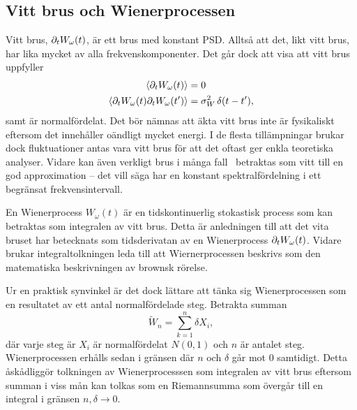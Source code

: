 \subsection{Vitt brus och Wienerprocessen}\label{sec:white_noise}
Vitt brus, $\partial_tW_\omega(t)$,\footnotemark{} är ett brus med konstant PSD. Alltså att det, likt vitt brus, har lika mycket av alla frekvenskomponenter. Det går dock att visa att vitt brus uppfyller \cite{Miller_probability2012}
\begin{equation}\label{eq:white_noise}
\begin{aligned}
\ev{\pd_tW_\omega(t)}&=0 \\
\ev{\pd_tW_\omega(t)\pd_tW_\omega(t')}&= \sigma_W^2 \, \delta(t-t'),
\end{aligned}
\end{equation}
samt är normalfördelat. 
Det bör nämnas att äkta vitt brus inte är fysikaliskt eftersom det innehåller oändligt mycket energi. I de flesta tillämpningar brukar dock fluktuationer antas vara vitt brus för att det oftast ger enkla teoretiska analyser. Vidare kan även verkligt brus i många fall~\cite{Engelberg_noise2007} betraktas som vitt till en god approximation -- det vill säga har en konstant spektralfördelning i ett begränsat frekvensintervall.


En Wienerprocess $W_\omega(t)$ är en tidskontinuerlig stokastisk process som kan betraktas som integralen av vitt brus\cite{Miller_probability2012}. Detta är anledningen till att det vita bruset har betecknats som tidsderivatan av en Wienerprocess $\partial_tW_\omega(t)$. Vidare brukar integraltolkningen leda till att Wiernerprocessen beskrivs som den matematiska beskrivningen av brownsk rörelse. 

Ur en praktisk synvinkel är det dock lättare att tänka sig Wienerprocessen som en resultatet av ett antal normalfördelade steg. Betrakta summan
\begin{equation}\label{eq:wiener_approx}
\tilde{W}_n = \sum_{k=1}^{n} \delta X_i,
\end{equation}
där varje steg är $X_i$ är normalfördelat $N(0,1)$ och $n$ är antalet steg. 
Wienerprocessen erhålls sedan i gränsen där $n$ och $\delta$ går mot $0$ samtidigt\cite{Miller_probability2012}. Detta åskådliggör tolkningen av Wienerprocesssen som integralen av vitt brus eftersom summan i viss mån kan tolkas som en Riemannsumma som övergår till en integral i gränsen $n, \delta \to 0$.

